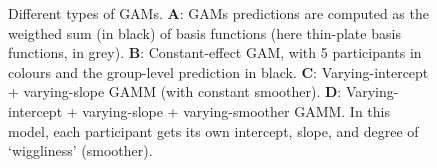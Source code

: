 \documentclass[
  doc,
  floatsintext,
  longtable,
  a4paper,
  nolmodern,
  notxfonts,
  notimes,
  donotrepeattitle,
  colorlinks=true,linkcolor=blue,citecolor=blue,urlcolor=blue]{apa7}
\begin{document}
\begin{figure}[!htb]

\caption{\label{fig-intro-gam}Different types of GAMs. \textbf{A}: GAMs
predictions are computed as the weigthed sum (in black) of basis
functions (here thin-plate basis functions, in grey). \textbf{B}:
Constant-effect GAM, with 5 participants in colours and the group-level
prediction in black. \textbf{C}: Varying-intercept + varying-slope GAMM
(with constant smoother). \textbf{D}: Varying-intercept + varying-slope
+ varying-smoother GAMM. In this model, each participant gets its own
intercept, slope, and degree of `wiggliness' (smoother).}


\end{figure}%
\end{document}
